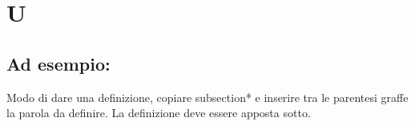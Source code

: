 \section*{U}
\markright{}
\subsection*{Ad esempio:}
Modo di dare una definizione, copiare subsection*{} e inserire tra le parentesi graffe la parola da definire. La definizione deve essere apposta sotto.
